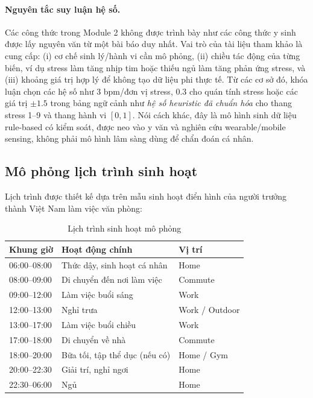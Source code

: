 \paragraph{Nguyên tắc suy luận hệ số.}
Các công thức trong Module 2 không được trình bày như các công thức y sinh được lấy nguyên văn từ một bài báo duy nhất. Vai trò của tài liệu tham khảo là cung cấp: (i) cơ chế sinh lý/hành vi cần mô phỏng, (ii) chiều tác động của từng biến, ví dụ stress làm tăng nhịp tim hoặc thiếu ngủ làm tăng phản ứng stress, và (iii) khoảng giá trị hợp lý để không tạo dữ liệu phi thực tế. Từ các cơ sở đó, khóa luận chọn các hệ số như $3$ bpm/đơn vị stress, $0.3$ cho quán tính stress hoặc các giá trị $\pm 1.5$ trong bảng ngữ cảnh như \textit{hệ số heuristic đã chuẩn hóa} cho thang stress 1--9 và thang hành vi $[0,1]$. Nói cách khác, đây là mô hình sinh dữ liệu rule-based có kiểm soát, được neo vào y văn và nghiên cứu wearable/mobile sensing, không phải mô hình lâm sàng dùng để chẩn đoán cá nhân.

\subsection{Mô phỏng lịch trình sinh hoạt}
\label{subsec:schedule_simulation}

Lịch trình được thiết kế dựa trên mẫu sinh hoạt điển hình của người trưởng thành Việt Nam làm việc văn phòng:

\begin{table}[H]
\centering
\caption{Lịch trình sinh hoạt mô phỏng}
\label{tab:daily_schedule}
\begin{tabular}{|l|l|l|}
\hline
\textbf{Khung giờ} & \textbf{Hoạt động chính} & \textbf{Vị trí} \\
\hline
06:00--08:00 & Thức dậy, sinh hoạt cá nhân & Home \\
08:00--09:00 & Di chuyển đến nơi làm việc & Commute \\
09:00--12:00 & Làm việc buổi sáng & Work \\
12:00--13:00 & Nghỉ trưa & Work / Outdoor \\
13:00--17:00 & Làm việc buổi chiều & Work \\
17:00--18:00 & Di chuyển về nhà & Commute \\
18:00--20:00 & Bữa tối, tập thể dục (nếu có) & Home / Gym \\
20:00--22:30 & Giải trí, nghỉ ngơi & Home \\
22:30--06:00 & Ngủ & Home \\
\hline
\end{tabular}
\end{table}

